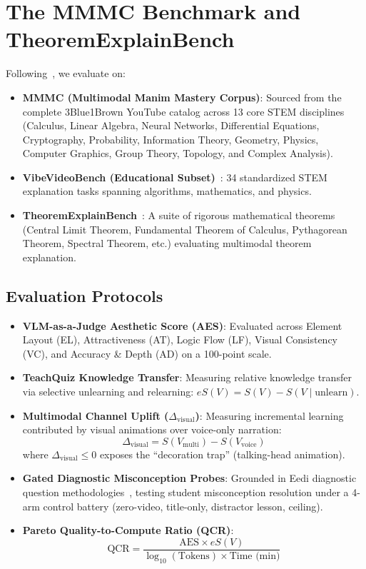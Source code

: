 \documentclass{article}
\begin{document}
\section{The MMMC Benchmark and TheoremExplainBench}
\label{sec:benchmarks}
Following~\cite{chen2025code2video}, we evaluate on:
\begin{itemize}
    \item \textbf{MMMC (Multimodal Manim Mastery Corpus)}: Sourced from the complete 3Blue1Brown YouTube catalog across 13 core STEM disciplines (Calculus, Linear Algebra, Neural Networks, Differential Equations, Cryptography, Probability, Information Theory, Geometry, Physics, Computer Graphics, Group Theory, Topology, and Complex Analysis).
    \item \textbf{VibeVideoBench (Educational Subset)}~\cite{vibevideobench2026}: 34 standardized STEM explanation tasks spanning algorithms, mathematics, and physics.
    \item \textbf{TheoremExplainBench}~\cite{ku2025theoremexplainbench}: A suite of rigorous mathematical theorems (Central Limit Theorem, Fundamental Theorem of Calculus, Pythagorean Theorem, Spectral Theorem, etc.) evaluating multimodal theorem explanation.
\end{itemize}

\subsection{Evaluation Protocols}
\begin{itemize}
    \item \textbf{VLM-as-a-Judge Aesthetic Score (AES)}: Evaluated across Element Layout (EL), Attractiveness (AT), Logic Flow (LF), Visual Consistency (VC), and Accuracy \& Depth (AD) on a 100-point scale.
    \item \textbf{TeachQuiz Knowledge Transfer}: Measuring relative knowledge transfer via selective unlearning and relearning: $eS(V) = S(V) - S(V \mid \text{unlearn})$.
    \item \textbf{Multimodal Channel Uplift ($\Delta_{\text{visual}}$)}: Measuring incremental learning contributed by visual animations over voice-only narration:
    \begin{equation}
        \Delta_{\text{visual}} = S(V_{\text{multi}}) - S(V_{\text{voice}})
    \end{equation}
    where $\Delta_{\text{visual}} \le 0$ exposes the ``decoration trap'' (talking-head animation).
    \item \textbf{Gated Diagnostic Misconception Probes}: Grounded in Eedi diagnostic question methodologies~\cite{eedi2020diagnostic}, testing student misconception resolution under a 4-arm control battery (zero-video, title-only, distractor lesson, ceiling).
    \item \textbf{Pareto Quality-to-Compute Ratio (QCR)}:
    \begin{equation}
        \text{QCR} = \frac{\text{AES} \times eS(V)}{\log_{10}(\text{Tokens}) \times \text{Time (min)}}
    \end{equation}
\end{itemize}
\end{document}
